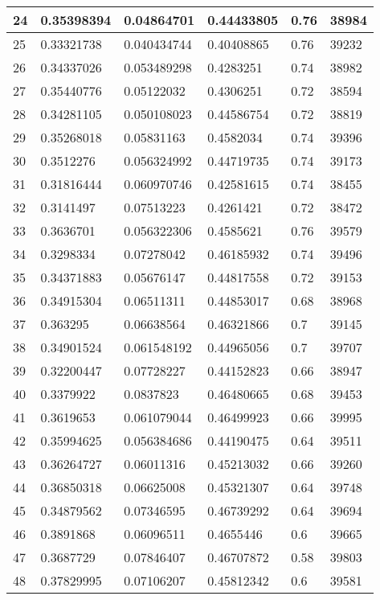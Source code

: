 \begin{longtable}{|l|l|l|l|l|l|}
24 & 0.35398394 & 0.04864701 & 0.44433805 & 0.76 & 38984 \\ \hline 
25 & 0.33321738 & 0.040434744 & 0.40408865 & 0.76 & 39232 \\ \hline 
26 & 0.34337026 & 0.053489298 & 0.4283251 & 0.74 & 38982 \\ \hline 
27 & 0.35440776 & 0.05122032 & 0.4306251 & 0.72 & 38594 \\ \hline 
28 & 0.34281105 & 0.050108023 & 0.44586754 & 0.72 & 38819 \\ \hline 
29 & 0.35268018 & 0.05831163 & 0.4582034 & 0.74 & 39396 \\ \hline 
30 & 0.3512276 & 0.056324992 & 0.44719735 & 0.74 & 39173 \\ \hline 
31 & 0.31816444 & 0.060970746 & 0.42581615 & 0.74 & 38455 \\ \hline 
32 & 0.3141497 & 0.07513223 & 0.4261421 & 0.72 & 38472 \\ \hline 
33 & 0.3636701 & 0.056322306 & 0.4585621 & 0.76 & 39579 \\ \hline 
34 & 0.3298334 & 0.07278042 & 0.46185932 & 0.74 & 39496 \\ \hline 
35 & 0.34371883 & 0.05676147 & 0.44817558 & 0.72 & 39153 \\ \hline 
36 & 0.34915304 & 0.06511311 & 0.44853017 & 0.68 & 38968 \\ \hline 
37 & 0.363295 & 0.06638564 & 0.46321866 & 0.7 & 39145 \\ \hline 
38 & 0.34901524 & 0.061548192 & 0.44965056 & 0.7 & 39707 \\ \hline 
39 & 0.32200447 & 0.07728227 & 0.44152823 & 0.66 & 38947 \\ \hline 
40 & 0.3379922 & 0.0837823 & 0.46480665 & 0.68 & 39453 \\ \hline 
41 & 0.3619653 & 0.061079044 & 0.46499923 & 0.66 & 39995 \\ \hline 
42 & 0.35994625 & 0.056384686 & 0.44190475 & 0.64 & 39511 \\ \hline 
43 & 0.36264727 & 0.06011316 & 0.45213032 & 0.66 & 39260 \\ \hline 
44 & 0.36850318 & 0.06625008 & 0.45321307 & 0.64 & 39748 \\ \hline 
45 & 0.34879562 & 0.07346595 & 0.46739292 & 0.64 & 39694 \\ \hline 
46 & 0.3891868 & 0.06096511 & 0.4655446 & 0.6 & 39665 \\ \hline 
47 & 0.3687729 & 0.07846407 & 0.46707872 & 0.58 & 39803 \\ \hline 
48 & 0.37829995 & 0.07106207 & 0.45812342 & 0.6 & 39581 \\ \hline 

\end{longtable}
